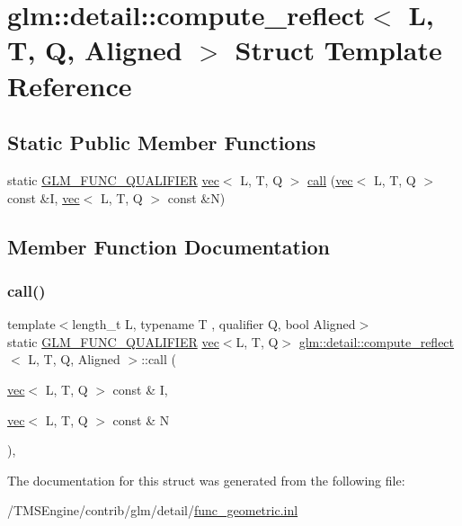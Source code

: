 \hypertarget{structglm_1_1detail_1_1compute__reflect}{}\section{glm\+:\+:detail\+:\+:compute\+\_\+reflect$<$ L, T, Q, Aligned $>$ Struct Template Reference}
\label{structglm_1_1detail_1_1compute__reflect}
\subsection*{Static Public Member Functions}
\begin{DoxyCompactItemize}
\item 
static \hyperlink{setup_8hpp_a33fdea6f91c5f834105f7415e2a64407}{G\+L\+M\+\_\+\+F\+U\+N\+C\+\_\+\+Q\+U\+A\+L\+I\+F\+I\+ER} \hyperlink{structglm_1_1vec}{vec}$<$ L, T, Q $>$ \hyperlink{structglm_1_1detail_1_1compute__reflect_a2f96de0f0e05a3587f4430941e71cd31}{call} (\hyperlink{structglm_1_1vec}{vec}$<$ L, T, Q $>$ const \&I, \hyperlink{structglm_1_1vec}{vec}$<$ L, T, Q $>$ const \&N)
\end{DoxyCompactItemize}


\subsection{Member Function Documentation}
\mbox{\label{structglm_1_1detail_1_1compute__reflect_a2f96de0f0e05a3587f4430941e71cd31}} 
\subsubsection{\texorpdfstring{call()}{call()}}
{\footnotesize\ttfamily template$<$length\+\_\+t L, typename T , qualifier Q, bool Aligned$>$ \\
static \hyperlink{setup_8hpp_a33fdea6f91c5f834105f7415e2a64407}{G\+L\+M\+\_\+\+F\+U\+N\+C\+\_\+\+Q\+U\+A\+L\+I\+F\+I\+ER} \hyperlink{structglm_1_1vec}{vec}$<$L, T, Q$>$ \hyperlink{structglm_1_1detail_1_1compute__reflect}{glm\+::detail\+::compute\+\_\+reflect}$<$ L, T, Q, Aligned $>$\+::call (\begin{DoxyParamCaption}\item[{\hyperlink{structglm_1_1vec}{vec}$<$ L, T, Q $>$ const \&}]{I,  }\item[{\hyperlink{structglm_1_1vec}{vec}$<$ L, T, Q $>$ const \&}]{N }\end{DoxyParamCaption})\hspace{0.3cm}{\ttfamily [inline]}, {\ttfamily [static]}}



The documentation for this struct was generated from the following file\+:\begin{DoxyCompactItemize}
\item 
/\+T\+M\+S\+Engine/contrib/glm/detail/\hyperlink{func__geometric_8inl}{func\+\_\+geometric.\+inl}\end{DoxyCompactItemize}
